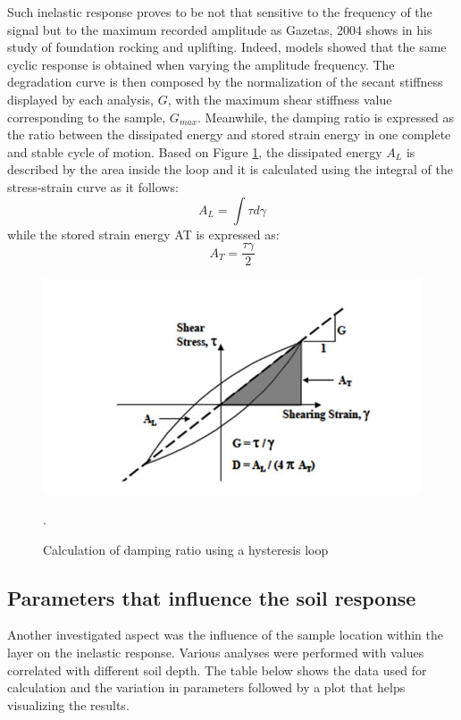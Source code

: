 \documentclass[10pt,a4paper]{report}
\begin{document}
Such inelastic response proves to be not that sensitive to the frequency of the signal but to the maximum recorded amplitude as Gazetas, 2004 shows in his study of foundation rocking and uplifting. Indeed, models showed that the same cyclic response is obtained when varying the amplitude frequency. 
The degradation curve is then composed by the normalization of the secant stiffness displayed by each analysis, $G$, with the maximum shear stiffness value corresponding to the sample, $G_{max}$. Meanwhile, the damping ratio is expressed as the ratio between the dissipated energy and stored strain energy in one complete and stable cycle of motion. Based on Figure \ref{loop}, the dissipated energy $A_L$ is described by the area inside the loop and it is calculated using the integral of the stress-strain curve as it follows:
\begin{equation}
	A_L=\int\tau d\gamma
\end{equation}
while the stored strain energy AT is expressed as:
\begin{equation}
	A_T=\frac{\tau \gamma}{2}
\end{equation}

\begin{figure}[h!]
	\centering
	\includegraphics[width=0.4\linewidth]{"loop"}
	\caption{Calculation of damping ratio using a hysteresis loop}
	\label{loop}.
\end{figure}

\subsection{Parameters that influence the soil response}
Another investigated aspect was the influence of the sample location within the layer on the inelastic response. Various analyses were performed with values correlated with different soil depth. The table below shows the data used for calculation and the variation in parameters followed by a plot that helps visualizing the results. 
\end{document}
